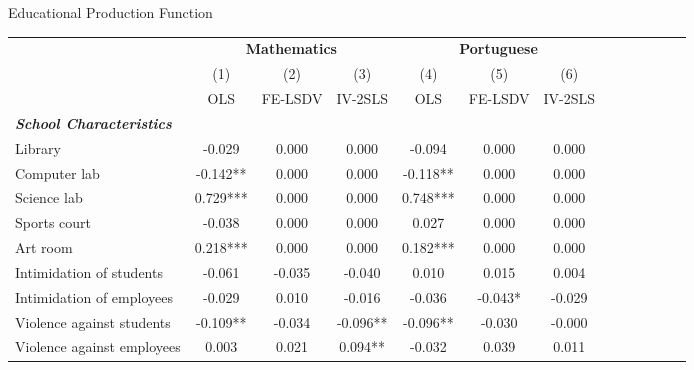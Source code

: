 \documentclass{beamer}
\begin{document}
\begin{frame}{Educational Production Function}
\vspace{-27pt} \flushright \hyperlink{Mirror}{\beamerbutton{\textcolor{red}{Mirror}}}
\vspace{-7pt}
\begin{table}
\begin{adjustbox}{max width=\textwidth} 
\begin{tabular}{l*{6}{cc}}
\toprule
& \multicolumn{3}{c}{\textbf{Mathematics}} &                      \multicolumn{3}{c}{\textbf{Portuguese}} \\            \cline{2-4}              \cline{5-7}                    
                    &\multicolumn{1}{c}{(1)}   &\multicolumn{1}{c}{(2)}   &\multicolumn{1}{c}{(3)}   &\multicolumn{1}{c}{(4)}   &\multicolumn{1}{c}{(5)}   &\multicolumn{1}{c}{(6)}   \\
                    &         OLS   &     FE-LSDV   &     IV-2SLS   &         OLS   &     FE-LSDV   &     IV-2SLS   \\
\midrule 
\textbf{\emph{School Characteristics}}&               &               &               &               &               &               \\
Library             &      -0.029   &       0.000   &       0.000   &      -0.094   &       0.000   &       0.000   \\
Computer lab        &      -0.142** &       0.000   &       0.000   &      -0.118** &       0.000   &       0.000   \\
Science lab         &       0.729***&       0.000   &       0.000   &       0.748***&       0.000   &       0.000   \\
Sports court        &      -0.038   &       0.000   &       0.000   &       0.027   &       0.000   &       0.000   \\
Art room            &       0.218***&       0.000   &       0.000   &       0.182***&       0.000   &       0.000   \\
Intimidation of students&      -0.061   &      -0.035   &      -0.040   &       0.010   &       0.015   &       0.004   \\
Intimidation of employees&      -0.029   &       0.010   &      -0.016   &      -0.036   &      -0.043*  &      -0.029   \\
Violence against students&      -0.109** &      -0.034   &      -0.096** &      -0.096** &      -0.030   &      -0.000   \\
Violence against employees &       0.003   &       0.021   &       0.094** &      -0.032   &       0.039   &       0.011   \\

\end{tabular}
\end{adjustbox}
\end{table}
\end{frame}
\end{document}
